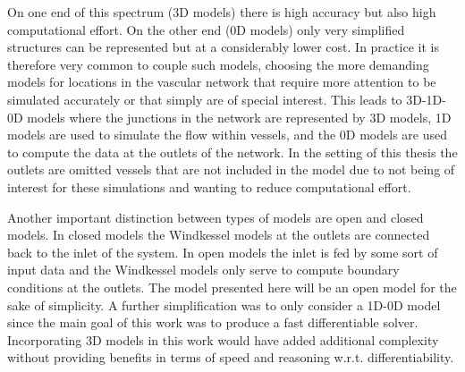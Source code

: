 \documentclass[a4paper, oneside]{discothesis}
\begin{document}
On one end of this spectrum (3D models) there is high accuracy but also high computational effort.
On the other end (0D models) only very simplified structures can be represented but at a considerably lower cost.
In practice it is therefore very common to couple such models, choosing the more demanding models for locations in the vascular network that require more attention to be simulated accurately or that simply are of special interest.
This leads to 3D-1D-0D models where the junctions in the network are represented by 3D models, 1D models are used to simulate the flow within vessels, and the 0D models are used to compute the data at the outlets of the network.
In the setting of this thesis the outlets are omitted vessels that are not included in the model due to not being of interest for these simulations and wanting to reduce computational effort.

Another important distinction between types of models are open and closed models.
In closed models the Windkessel models at the outlets are connected back to the inlet of the system.
In open models the inlet is fed by some sort of input data and the Windkessel models only serve to compute boundary conditions at the outlets.
The model presented here will be an open model for the sake of simplicity.
A further simplification was to only consider a 1D-0D model since the main goal of this work was to produce a fast differentiable solver.
Incorporating 3D models in this work would have added additional complexity without providing benefits in terms of speed and reasoning w.r.t. differentiability. \cite{köppl2023dimension}
\end{document}
